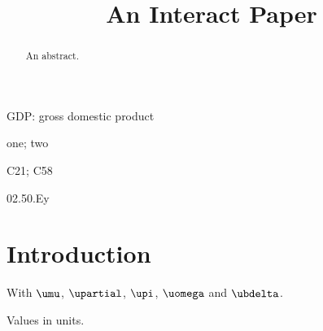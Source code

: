 \documentclass{interact}
\begin{document}
\title{An Interact Paper}
\author{
}
\maketitle
\begin{abstract}An abstract.\end{abstract}
\begin{abbreviations}GDP: gross domestic product\end{abbreviations}
\begin{keywords}one; two\end{keywords}
\begin{jelcode}C21; C58\end{jelcode}
\begin{pacscode}02.50.Ey\end{pacscode}
\section{Introduction}
With $\umu$, $\upartial$, $\upi$, $\uomega$ and $\ubdelta$.
\begin{table}
\begin{tabnote}[Note]Values in units.\end{tabnote}\end{table}
\end{document}

